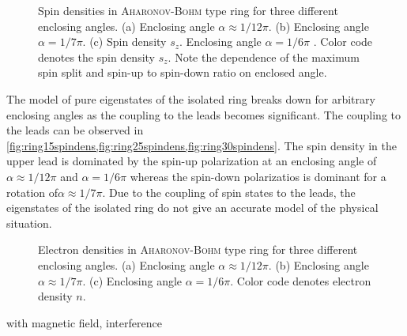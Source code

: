 \begin{figure}[h!]
  \caption{Spin densities in \textsc{Aharonov-Bohm} type ring for three different enclosing angles. (a) Enclosing angle $\alpha\approx 1/12 \pi$. (b) Enclosing angle $\alpha=1/7\pi$. (c) Spin density $s_z$. Enclosing angle $\alpha=1/6\pi$ . Color code denotes the spin density $s_z$. Note the dependence of the maximum spin split and spin-up to spin-down ratio on enclosed angle.}
\end{figure}
The model of pure eigenstates of the isolated ring breaks down for arbitrary enclosing angles as the coupling to the leads becomes significant. The coupling to the leads can be observed in \cref{fig:ring15spindens,fig:ring25spindens,fig:ring30spindens}. The spin density in the upper lead is dominated by the spin-up polarization at an enclosing angle of $\alpha\approx 1/12\pi$ and $\alpha= 1/6\pi$ whereas the spin-down polarizatios is dominant for a rotation of$\alpha\approx 1/7\pi$. Due to the coupling of spin states to the leads, the eigenstates of the isolated ring do not give an accurate model of the physical situation.\par 
\begin{figure}[ht!]
    \caption{Electron densities in \textsc{Aharonov-Bohm} type ring for three different enclosing angles. (a) Enclosing angle $\alpha\approx 1/12 \pi$. (b) Enclosing angle $\alpha\approx 1/7\pi$. (c) Enclosing angle $\alpha=1/6\pi$. Color code denotes electron density $n$.} 
\end{figure}
 with magnetic field, interference \cite{Nitta2002PhysicaE.12.753}
